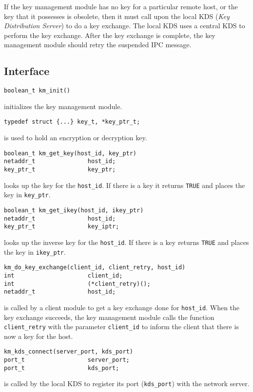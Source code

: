 If the key management module has no key for a particular remote host, or the
key that it possesses is obsolete, then it must call upon the local KDS
({\it Key Distribution Server\/}) to do a key exchange.  The local KDS uses
a central KDS to perform the key exchange.  After the key exchange is
complete, the key management module should retry the suspended IPC message.

\subsection{Interface}
\begin{verbatim}
boolean_t km_init()
\end{verbatim}
initializes the key management module.

\begin{verbatim}
typedef struct {...} key_t, *key_ptr_t;
\end{verbatim}
is used to hold an encryption or decryption key.

\begin{verbatim}
boolean_t km_get_key(host_id, key_ptr)
netaddr_t               host_id;
key_ptr_t               key_ptr;
\end{verbatim}
looks up the key for the \verb"host_id".  If there is a key it returns
\verb"TRUE" and places the key in \verb"key_ptr".

\begin{verbatim}
boolean_t km_get_ikey(host_id, ikey_ptr)
netaddr_t               host_id;
key_ptr_t               key_iptr;
\end{verbatim}
looks up the inverse key for the \verb"host_id".  If there is a key returns
\verb"TRUE" and places the key in \verb"ikey_ptr".

\begin{verbatim}
km_do_key_exchange(client_id, client_retry, host_id)
int                     client_id;
int                     (*client_retry)();
netaddr_t               host_id;
\end{verbatim}
is called by a client module to get a key exchange done for \verb"host_id".
When the key exchange succeeds, the key management module calls the function
\verb"client_retry" with the parameter \verb"client_id" to inform the client
that there is now a key for the host.

\begin{verbatim}
km_kds_connect(server_port, kds_port)
port_t                  server_port;
port_t                  kds_port;
\end{verbatim}
is called by the local KDS to register its port (\verb"kds_port") with the
network server.

